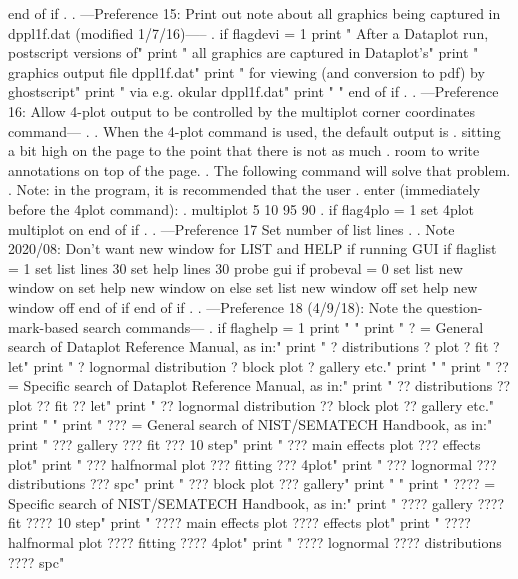 end of if
.
. ---Preference 15: Print out note about all graphics being captured in dppl1f.dat (modified 1/7/16)-----
.
if flagdevi = 1
   print "      After a Dataplot run, postscript versions of"
   print "      all graphics are captured in Dataplot's"
   print "      graphics output file     dppl1f.dat"
   print "      for viewing (and conversion to pdf) by ghostscript"
   print "      via e.g.    okular dppl1f.dat"
   print " "
end of if
.
. ---Preference 16: Allow 4-plot output to be controlled by the    multiplot corner coordinates    command---
.
.    When the 4-plot command is used, the default output is
.    sitting a bit high on the page to the point that there is not as much
.    room to write annotations on top of the page.
.    The following command will solve that problem.
.    Note: in the program, it is recommended that the user
.          enter (immediately before the 4plot command):
.             multiplot 5 10 95 90
.
if flag4plo = 1
   set 4plot multiplot on
end of if
.
. ---Preference 17 Set number of list lines
.
.    Note 2020/08: Don't want new window for LIST and HELP if running GUI
if flaglist = 1
   set list lines 30
   set help lines 30
   probe gui
   if probeval = 0
      set list new window on
      set help new window on
   else
      set list new window off
      set help new window off
   end of if
end of if
.
. ---Preference 18 (4/9/18): Note the question-mark-based search commands---
.
if flaghelp = 1
   print " "
   print "      ? = General  search of Dataplot Reference Manual, as in:"
   print "          ? distributions   ? plot   ? fit   ? let"
   print "          ? lognormal distribution   ? block plot   ? gallery   etc."
   print " "
   print "     ?? = Specific search of Dataplot Reference Manual, as in:"
   print "          ?? distributions   ?? plot   ?? fit   ?? let"
   print "          ?? lognormal distribution    ?? block plot   ?? gallery   etc."
   print " "
   print "    ??? = General  search of NIST/SEMATECH Handbook, as in:"
   print "          ??? gallery   ??? fit   ??? 10 step"
   print "          ??? main effects plot   ??? effects plot"
   print "          ??? halfnormal plot     ??? fitting   ??? 4plot"
   print "          ??? lognormal   ??? distributions   ??? spc"
   print "          ??? block plot  ??? gallery"
   print " "
   print "   ???? = Specific search of NIST/SEMATECH Handbook, as in:"
   print "          ???? gallery   ???? fit   ???? 10 step"
   print "          ???? main effects plot   ???? effects plot"
   print "          ???? halfnormal plot     ???? fitting   ???? 4plot"
   print "          ???? lognormal   ???? distributions   ???? spc"
